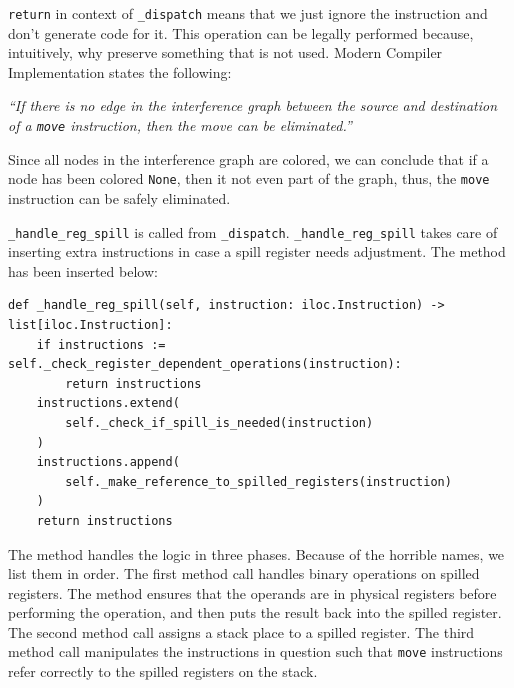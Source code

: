 \texttt{return} in context of \texttt{\_dispatch} means that we just ignore the instruction and don't generate code for it. This operation can be legally performed because, intuitively, why preserve something that is not used. Modern Compiler Implementation states the following:

\begin{displayquote}
    \textit{``If there is no edge in the interference graph between the source and destination of a \texttt{move} instruction, then the move can be eliminated.''}
\end{displayquote}
\hspace*{}

Since all nodes in the interference graph are colored, we can conclude that if a node has been colored \texttt{None}, then it not even part of the graph, thus, the \texttt{move} instruction can be safely eliminated.

\texttt{\_handle\_reg\_spill} is called from \texttt{\_dispatch}. \texttt{\_handle\_reg\_spill} takes care of inserting extra instructions in case a spill register needs adjustment. The method has been inserted below:

\begin{verbatim}
def _handle_reg_spill(self, instruction: iloc.Instruction) -> list[iloc.Instruction]:
    if instructions := self._check_register_dependent_operations(instruction):
        return instructions
    instructions.extend(
        self._check_if_spill_is_needed(instruction)
    )
    instructions.append(
        self._make_reference_to_spilled_registers(instruction)
    )
    return instructions
\end{verbatim}

The method handles the logic in three phases. Because of the horrible names, we list them in order. The first method call handles binary operations on spilled registers. The method ensures that the operands are in physical registers before performing the operation, and then puts the result back into the spilled register. The second method call assigns a stack place to a spilled register. The third method call manipulates the instructions in question such that \texttt{move} instructions refer correctly to the spilled registers on the stack.


